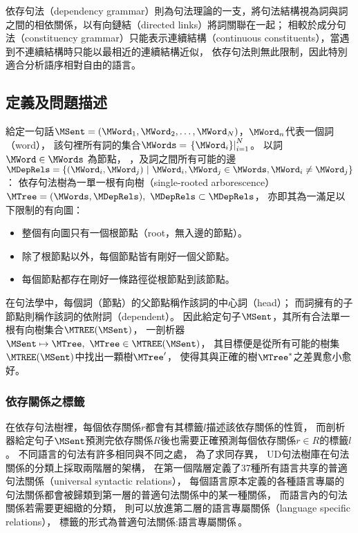 依存句法（dependency grammar）則為句法理論的一支，將句法結構視為詞與詞之間的相依關係，以有向鏈結（directed links）將詞關聯在一起；
相較於成分句法（constituency grammar）只能表示連續結構（continuous constituents），當遇到不連續結構時只能以最相近的連續結構近似，
依存句法則無此限制，因此特別適合分析語序相對自由的語言。

\subsection{定義及問題描述}
給定一句話$\MSent = (\MWord_{1}, \MWord_{2}, \ldots, \MWord_{N})$，$\MWord_{n}$代表一個詞（word），
該句裡所有詞的集合$\MWords = \left.\{\MWord_{i}\}\right\vert_{i=1}^{N}$。
以詞 $\MWord \in \MWords$ 為節點，
，及詞之間所有可能的邊
$\mathcal{\MDepRels} = \{(\MWord_{i}, \MWord_{j})\ |\ \MWord_{i},\MWord_{j} \in \MWords, \MWord_{i} \neq \MWord_{j}\}$：
依存句法樹為一單一根有向樹（single-rooted arborescence）$\MTree=(\MWords, \MDepRels),\ \MDepRels \subset \mathcal{\MDepRels}$，
亦即其為一滿足以下限制的有向圖：
\begin{itemize}
    \item 整個有向圖只有一個根節點（root，無入邊的節點）。
    \item 除了根節點以外，每個節點皆有剛好一個父節點。
    \item 每個節點都存在剛好一條路徑從根節點到該節點。
\end{itemize}
在句法學中，每個詞（節點）的父節點稱作該詞的中心詞（head）；
而詞擁有的子節點則稱作該詞的依附詞（dependent）。
因此給定句子$\MSent$，其所有合法單一根有向樹集合$\MakeUppercase{\MTree}(\MSent)$，
一剖析器$\MSent \mapsto \MTree,\ \MTree \in \MakeUppercase{\MTree}(\MSent)$，
其目標便是從所有可能的樹集$\MakeUppercase{\MTree}(\MSent)$中找出一顆樹$\MTree'$，
使得其與正確的樹$\MTree^{*}$之差異愈小愈好。

\subsubsection{依存關係之標籤}
在依存句法樹裡，每個依存關係$r$都會有其標籤$l$描述該依存關係的性質，
而剖析器給定句子$\MSent$預測完依存關係$R$後也需要正確預測每個依存關係$r \in R$的標籤$l$。
不同語言的句法有許多相同與不同之處，
為了求同存異，
UD句法樹庫在句法關係的分類上採取兩階層的架構，
在第一個階層定義了37種所有語言共享的普適句法關係（universal syntactic relations），
每個語言原本定義的各種語言專屬的句法關係都會被歸類到第一層的普適句法關係中的某一種關係，
而語言內的句法關係若需要更細緻的分類，
則可以放進第二層的語言專屬關係（language specific relations），
標籤的形式為$\textrm{普適句法關係}:\textrm{語言專屬關係}$。

